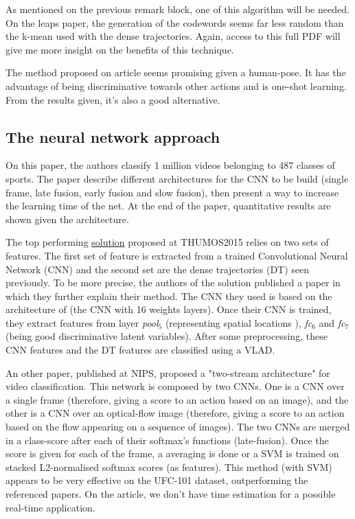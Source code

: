 \documentclass[a4paper]{article}
\begin{document}
			\begin{mdframed}[backgroundcolor = gray!30]
				As mentioned on the previous remark block, one of this algorithm will be needed. On the leaps paper\cite{kwon2014complexity}, the generation of the codewords seems far less random than the k-mean used with the dense trajectories. Again, access to this full PDF will give me more insight on the benefits of this technique.

				The method proposed on article\cite{zanfir2013moving} seems promising given a human-pose. It has the advantage of being discriminative towards other actions and is one-shot learning. From the results given, it's also a good alternative.
			\end{mdframed}



		\subsection{The neural network approach}
			On this paper\cite{karpathy2014large}, the authors classify 1 million videos belonging to 487 classes of sports. The paper describe different architectures for the CNN to be build (single frame, late fusion, early fusion and slow fusion), then present a way to increase the learning time of the net. At the end of the paper, quantitative results are shown given the architecture.

			The top performing \href{http://storage.googleapis.com/www.thumos.info/thumos15_notebooks/TH15_UTS&CMU.pdf}{solution} proposed at THUMOS2015\cite{THUMOS15} relies on two sets of features. The first set of feature is extracted from a trained Convolutional Neural Network (CNN) and the second set are the dense trajectories (DT) seen previously. To be more precise, the authors of the solution published a paper\cite{xu2014discriminative} in which they further explain their method. The CNN they used is based on the architecture of \cite{simonyan2014very} (the CNN with 16 weights layers). Once their CNN is trained, they extract features from layer \textit{pool$_5$} (representing spatial locations ), \textit{fc$_6$} and \textit{fc$_7$} (being good discriminative latent variables). After some preprocessing, these CNN features and the DT features are classified using a VLAD.

			An other paper\cite{simonyan2014two}, published at NIPS, proposed a "two-stream architecture" for video classification. This network is composed by two CNNs. One is a CNN over a single frame (therefore, giving a score to an action based on an image), and the other is a CNN over an optical-flow image (therefore, giving a score to an action based on the flow appearing on a sequence of images). The two CNNs are merged in a class-score after each of their softmax's functions (late-fusion). Once the score is given for each of the frame, a averaging is done or a SVM is trained on stacked L2-normalised softmax scores (as features). This method (with SVM) appears to be very effective on the UFC-101 dataset, outperforming the referenced papers. On the article, we don't have time estimation for a possible real-time application.
\end{document}
